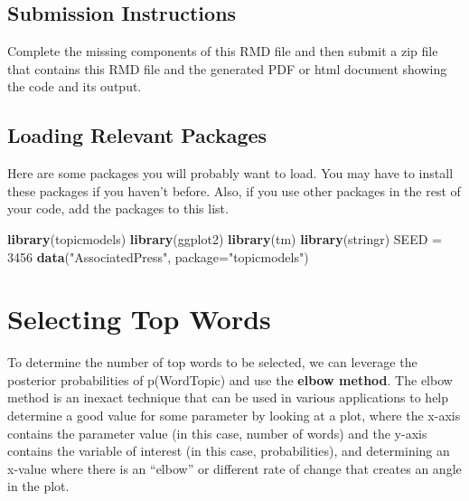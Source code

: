 \documentclass[]{article}
\newenvironment{Shaded}{\begin{snugshade}}{\end{snugshade}}
\newcommand{\DataTypeTok}[1]{\textcolor[rgb]{0.13,0.29,0.53}{#1}}
\newcommand{\DecValTok}[1]{\textcolor[rgb]{0.00,0.00,0.81}{#1}}
\newcommand{\KeywordTok}[1]{\textcolor[rgb]{0.13,0.29,0.53}{\textbf{#1}}}
\newcommand{\NormalTok}[1]{#1}
\newcommand{\StringTok}[1]{\textcolor[rgb]{0.31,0.60,0.02}{#1}}
\begin{document}
\hypertarget{submission-instructions}{%
\subsection{Submission Instructions}\label{submission-instructions}}

Complete the missing components of this RMD file and then submit a zip
file that contains this RMD file and the generated PDF or html document
showing the code and its output.

\hypertarget{loading-relevant-packages}{%
\subsection{Loading Relevant Packages}\label{loading-relevant-packages}}

Here are some packages you will probably want to load. You may have to
install these packages if you haven't before. Also, if you use other
packages in the rest of your code, add the packages to this list.

\begin{Shaded}
\begin{Highlighting}[]
\KeywordTok{library}\NormalTok{(topicmodels)}
\KeywordTok{library}\NormalTok{(ggplot2)}
\KeywordTok{library}\NormalTok{(tm)}
\KeywordTok{library}\NormalTok{(stringr)}
\NormalTok{SEED =}\StringTok{ }\DecValTok{3456}
\KeywordTok{data}\NormalTok{(}\StringTok{"AssociatedPress"}\NormalTok{, }\DataTypeTok{package=}\StringTok{"topicmodels"}\NormalTok{)}
\end{Highlighting}
\end{Shaded}

\hypertarget{selecting-top-words}{%
\section{Selecting Top Words}\label{selecting-top-words}}

To determine the number of top words to be selected, we can leverage the
posterior probabilities of p(Word\textbar{}Topic) and use the
\textbf{elbow method}. The elbow method is an inexact technique that can
be used in various applications to help determine a good value for some
parameter by looking at a plot, where the x-axis contains the parameter
value (in this case, number of words) and the y-axis contains the
variable of interest (in this case, probabilities), and determining an
x-value where there is an ``elbow'' or different rate of change that
creates an angle in the plot.
\end{document}
